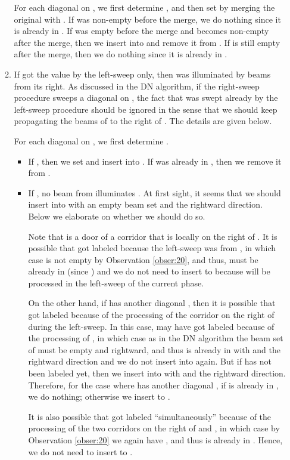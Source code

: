 \documentclass[english,runningheads,11pt]{llncs-revised}
\begin{document}
\begin{enumerate}
\begin{enumerate}
For each diagonal  on ,
we first determine , and then set  by merging the
original  with . If  was non-empty
before the merge, we do nothing since it is already in .
If  was empty before the
merge and becomes non-empty after the merge, then we insert  into
 and remove it from .
If  is still empty after the merge, then we do nothing
since it is already in .

\item
If  got the value  by the left-sweep only, then 
was illuminated by beams from its right. As discussed in the DN
algorithm, if the right-sweep procedure sweeps a diagonal  on ,
the fact that  was swept already by the left-sweep procedure
should be ignored in the sense that we should keep propagating the
beams of  to the right of . The details are given below.

For each diagonal  on , we first determine .

\begin{itemize}
\item
If , then we set 
and insert  into . If  was already in , then we remove
it from .

\item
If , no beam from  illuminates .
At first sight, it seems that we should insert  into 
with an empty beam set and the rightward direction.
Below we elaborate on whether we should do so.

Note that  is a door of a corridor  that is locally on the
right of .  It is possible that  got labeled
because the left-sweep was from , in which case
 is not empty by Observation \ref{obser:20},
and thus,  must be already in  (since )
and we do not need to insert  to  because  will be processed in the left-sweep of the current phase.

On the other hand, if  has another diagonal , then it is
possible that  got labeled because of the processing of the
corridor on the right of  during the left-sweep. In this case,  may have got
labeled because of the processing of , in which case as in
the DN algorithm the beam set of  must be empty and rightward, and thus 
is already in  with  and the rightward direction and we do
not insert  into  again. But if  has not been labeled yet,
then we insert  into  with  and the rightward
direction. Therefore, for the case where  has another diagonal
, if  is already in , we do
nothing; otherwise we insert  to .

It is also possible that  got labeled ``simultaneously'' because
of the processing of the two corridors on the right of  and ,
in which case by Observation \ref{obser:20} we again have , and thus  is already in . Hence, we do not need to insert  to .


\end{itemize}
\end{enumerate}
\end{enumerate}
\end{document}
